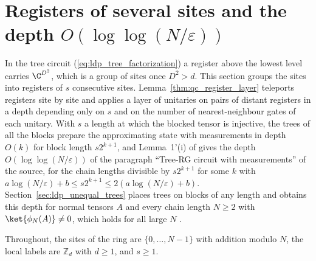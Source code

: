 
\section{Registers of several sites and the depth \texorpdfstring{$O(\log\log(N/\varepsilon))$}{O(log log(N/epsilon))}}
\label{sec:ldp_register_tree}

In the tree circuit (\ref{eq:ldp_tree_factorization}) a register above the
lowest level carries $\C^{D^2}$, which is a group of sites once $D^2>d$. This
section groups the sites into registers of $s$ consecutive sites.
Lemma~\ref{thm:qc_register_layer} teleports registers site by site and
applies a layer of unitaries on pairs of distant registers in a depth
depending only on $s$ and on the number of nearest-neighbour gates of each
unitary. With $s$ a length at which the blocked
tensor is injective, the trees of all the blocks prepare the approximating state
with measurements in depth $O(k)$ for block length $s2^{k+1}$, and Lemma~1'(i)
of \cite{Malz2024Preparation} gives the depth $O(\log\log(N/\varepsilon))$ of
the paragraph ``Tree-RG circuit with measurements'' of the source, for the chain
lengths divisible by $s2^{k+1}$ for some $k$ with
$a\log(N/\varepsilon)+b\le s2^{k+1}\le2(a\log(N/\varepsilon)+b)$.
Section~\ref{sec:ldp_unequal_trees} places trees on blocks of any length and
obtains this depth for normal tensors $A$ and every chain length $N\ge2$ with
$\ket{\phi_N(A)}\neq0$, which holds for all large $N$
\cite{gap:mswc24_tree_measurement_scope}.

Throughout, the sites of the ring are $\{0,\dots,N-1\}$ with addition modulo
$N$, the local labels are $\mathbb Z_d$ with $d\ge1$, and $s\ge1$.

